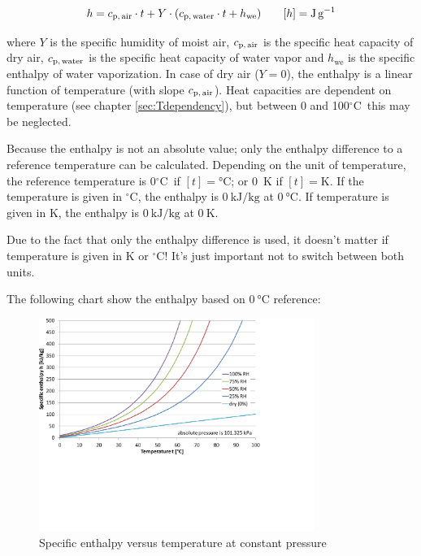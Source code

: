 \documentclass[11pt,a4paper,english,twoside]{scrreprt}
\newcommand{\gradC}{${}^\circ$C}      %
\begin{document}
\[
h=c_\text{p,\,air} \cdot t+Y\cdot (c_\text{p,\,water} \cdot t+h_\text{we}) \qquad [h] = \si{\joule\per\gram}
\]

where $Y$ is the specific humidity of moist air, $c_\text{p,\,air}$ is the specific heat capacity of dry air, $c_\text{p,\,water}$ is the specific heat capacity of water vapor and $h_\text{we}$ is the specific enthalpy of water vaporization. In case of dry air ($Y=0$), the enthalpy is a linear function of temperature (with slope $c_\text{p,\,air}$). Heat capacities are dependent on temperature (see chapter \ref{sec:Tdependency}), but between 0 and 100\gradC\ this may be neglected.

Because the enthalpy is not an absolute value; only the enthalpy difference to a reference temperature can be calculated. Depending on the unit of temperature, the reference temperature is 0\gradC\ if $[t] = \si{\degreeCelsius}$; or 0~K if $[t] = \si{\kelvin}$. If the temperature is given in \gradC, the enthalpy is $\SI{0}{\kilo\joule\per\kilogram}$ at $\SI{0}{\degreeCelsius}$. If temperature is given in K, the enthalpy is $\SI{0}{\kilo\joule\per\kilogram}$ at $\SI{0}{\kelvin}$.

Due to the fact that only the enthalpy difference is used, it doesn't matter if temperature is given in K or \gradC! It's just important not to switch between both units.

The following chart show the enthalpy based on $\SI{0}{\degreeCelsius}$ reference:

\begin{figure}
  \centering
  \includegraphics*[width=0.8\textwidth,angle=0]{FCF_Diag_h.pdf}
  \caption[Specific enthalpy versus temperature at constant pressure]{Specific enthalpy versus temperature at constant pressure}
\end{figure}
\end{document}
